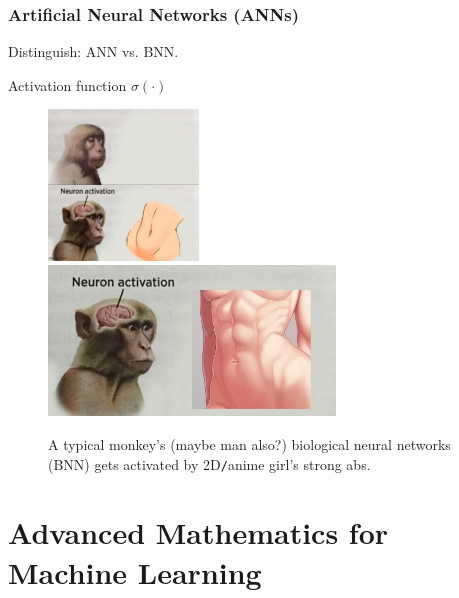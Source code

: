 \documentclass{beamer}
\begin{document}
\begin{frame}
	\frametitle{Artificial Neural Networks (ANNs)}
	Distinguish: ANN vs. BNN.
	
	Activation function $\sigma(\cdot)$
	\begin{figure}[H]
		\includegraphics[height=4cm]{neuron_activation_anime}\includegraphics[height=4cm]{neuron_activation}
		\caption{A typical monkey's (maybe man also?) biological neural networks (BNN) gets activated by 2D{\tt/}anime girl's strong abs.}
	\end{figure}
\end{frame}

\section{Advanced Mathematics for Machine Learning}
	
\end{document}
